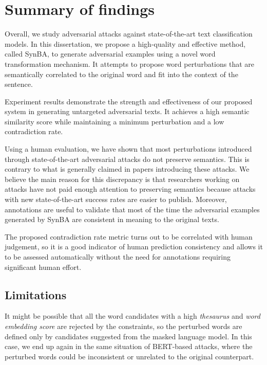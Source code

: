 \section{Summary of findings}\label{sec:summary-of-findings}


Overall, we study adversarial attacks against state-of-the-art text classification models.
In this dissertation, we propose a high-quality and effective method, called SynBA, to generate adversarial examples using a novel word transformation mechanism. It attempts to propose word perturbations that are semantically correlated to the original word and fit into the context of the sentence.

Experiment results demonstrate the strength and effectiveness of our proposed system in generating untargeted adversarial texts. 
It achieves a high semantic similarity score while maintaining a minimum perturbation and a low contradiction rate.

Using a human evaluation, we have shown that most perturbations introduced through state-of-the-art adversarial attacks do not preserve semantics. This is contrary to what is generally claimed in papers introducing these attacks. We believe the main reason for this discrepancy is that researchers working on attacks have not paid enough attention to preserving semantics because attacks with new state-of-the-art success rates are easier to publish.
Moreover, annotations are useful to validate that most of the time the adversarial examples generated by SynBA are consistent in meaning to the original texts.

The proposed contradiction rate metric turns out to be correlated with human judgement, so it is a good indicator of human prediction consistency and allows it to be assessed automatically without the need for annotations requiring significant human effort.


\subsection{Limitations}\label{subsec:limitations}
It might be possible that all the word candidates with a high \emph{thesaurus} and \emph{word embedding score} are rejected by the constraints, so the perturbed words are defined only by candidates suggested from the masked language model.
In this case, we end up again in the same situation of BERT-based attacks, where the perturbed words could be inconsistent or unrelated to the original counterpart.

